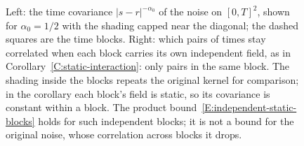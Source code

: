 \begin{figure}[!tb]
  \centering
  
  \caption[The noise remembers across time blocks]{Left: the time covariance
    $|s-r|^{-\alpha_0}$ of the noise on $[0,T]^2$, shown for $\alpha_0 = 1/2$ with
    the shading capped near the diagonal; the dashed squares are the time blocks.
    Right: which pairs of times stay correlated when each block carries its own
    independent field, as in Corollary~\ref{C:static-interaction}: only pairs in
    the same block. The shading inside the blocks repeats the original kernel for
    comparison; in the corollary each block's field is static, so its covariance
    is constant within a block. The product bound~\eqref{E:independent-static-blocks}
    holds for such independent blocks; it is not a bound for the original noise,
    whose correlation across blocks it drops.}
  \label{Fig:noise-memory}
\end{figure}
